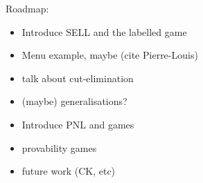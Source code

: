 
Roadmap:
\begin{itemize}
\item Introduce SELL and the labelled game
\item Menu example, maybe (cite Pierre-Louis)
\item talk about cut-elimination
\item (maybe) generalisations?
\item Introduce PNL and games
\item provability games
\item future work (CK, etc)
\end{itemize}


